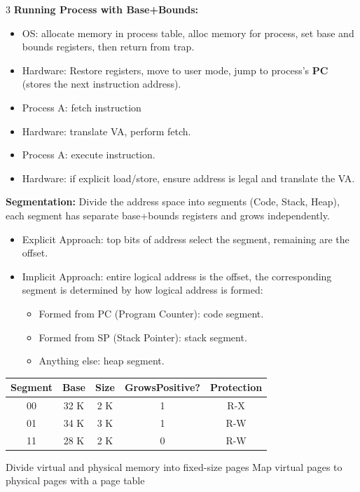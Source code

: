 \documentclass[8pt]{innovativeinnovation-cheatsheet}
\begin{document}
\begin{multicols*}{3}
\textbf{Running Process with Base+Bounds:}
\begin{itemize}
      \item OS: allocate memory in process table, alloc memory for process, set base and bounds registers, then return from trap.
      \item Hardware: Restore registers, move to user mode, jump to process's \textbf{PC} (stores the next instruction address).
      \item Process A: fetch instruction
      \item Hardware: translate VA, perform fetch.
      \item Process A: execute instruction.
      \item Hardware: if explicit load/store, ensure address is legal and translate the VA.
\end{itemize}

\textbf{Segmentation:} Divide the address space into segments (Code, Stack, Heap), each segment has separate base+bounds registers and grows independently.
\begin{itemize}
      \item Explicit Approach: top bits of address select the segment, remaining are the offset.
      \item Implicit Approach: entire logical address is the offset, the corresponding segment is determined by how logical address is formed:
      \begin{itemize}
            \item Formed from PC (Program Counter): code segment.
            \item Formed from SP (Stack Pointer): stack segment.
            \item Anything else: heap segment.
      \end{itemize}
\end{itemize}

\begin{center}
\begin{tabular}{ccccc} 
      Segment & Base & Size & GrowsPositive? & Protection \\
      \hline 
      00 & 32 K & 2 K & 1 & R-X \\
      01 & 34 K & 3 K & 1 & R-W \\
      11 & 28 K & 2 K & 0 & R-W
\end{tabular}
\end{center}

 Divide virtual and physical memory into fixed-size pages Map virtual pages to physical pages with a page table


\end{multicols*}
\end{document}
